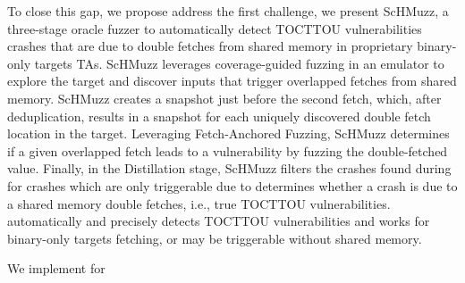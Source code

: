 \documentclass[conference]{IEEEtran} %
\newcommand{\sysname}{ScHMuzz\xspace}
\newcommand{\stagetwo}{Fetch-Anchored Fuzzing\xspace} %
\newcommand{\stagethree}{Distillation\xspace}
\providecommand{\DIFaddtex}[1]{{\protect\color{blue} \sf #1}} %
\providecommand{\DIFdeltex}[1]{{\protect\color{red} \scriptsize #1}} %
\providecommand{\DIFaddbegin}{} %
\providecommand{\DIFaddend}{} %
\providecommand{\DIFdelbegin}{} %
\providecommand{\DIFdelend}{} %
\providecommand{\DIFadd}[1]{\texorpdfstring{\DIFaddtex{#1}}{#1}} %
\providecommand{\DIFdel}[1]{\texorpdfstring{\DIFdeltex{#1}}{}} %
\begin{document}
To \DIFdelbegin \DIFdel{close this gap, we propose }\DIFdelend \DIFaddbegin \DIFadd{address the first challenge, we present }\DIFaddend \sysname, a three-stage \DIFdelbegin \DIFdel{oracle }\DIFdelend \DIFaddbegin \DIFadd{fuzzer }\DIFaddend to 
automatically detect \DIFdelbegin \DIFdel{TOCTTOU vulnerabilities }\DIFdelend \DIFaddbegin \DIFadd{crashes that are due to double fetches from shared memory }\DIFaddend in proprietary binary-only \DIFdelbegin \DIFdel{targets}\DIFdelend \DIFaddbegin \DIFadd{TAs}\DIFaddend . 
\sysname leverages coverage-guided fuzzing in an emulator to explore the target and 
discover inputs that trigger overlapped fetches from shared memory. \sysname creates 
a snapshot just before the second fetch, which, after deduplication, results in a 
snapshot for each uniquely discovered double fetch location in the target.
Leveraging \stagetwo, \sysname determines if a given overlapped fetch leads 
to a vulnerability by fuzzing the double-fetched value. 
Finally, \DIFaddbegin \DIFadd{in the }\stagethree \DIFadd{stage, }\DIFaddend \sysname \DIFdelbegin \DIFdel{filters the crashes found during }%
\DIFdel{for crashes which are only triggerable due to }\DIFdelend \DIFaddbegin \DIFadd{determines whether a crash is due to a 
}\DIFaddend shared memory double \DIFdelbegin \DIFdel{fetches, i.e., true 
TOCTTOU vulnerabilities. }%
\DIFdel{automatically 
and precisely detects TOCTTOU vulnerabilities and works for binary-only 
targets}\DIFdelend \DIFaddbegin \DIFadd{fetching, or may be triggerable without shared memory}\DIFaddend . 

\DIFdelbegin \DIFdel{We implement }%
\DIFdel{for }\DIFdelend %
\DIFaddbegin 
\end{document}
